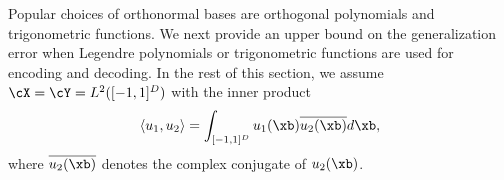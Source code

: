 \documentclass[11pt]{article} %
\begin{document}
%	
Popular choices of orthonormal bases are orthogonal polynomials and trigonometric functions. We next provide an upper bound on the generalization error when Legendre polynomials or trigonometric functions are used for encoding and decoding.
In the rest of this section, we assume 
$\cX=\cY= L^2([-1,1]^D)$ with the inner product 
\begin{align}
	\langle u_1,u_2\rangle=\int_{[-1,1]^D} u_1(\xb)\overline{u_2(\xb)}d\xb,
	\label{eqinnerproduct}
\end{align}
where $\overline{u_2(\xb)}$ denotes the complex conjugate of $u_2(\xb)$. 



%
\end{document}
